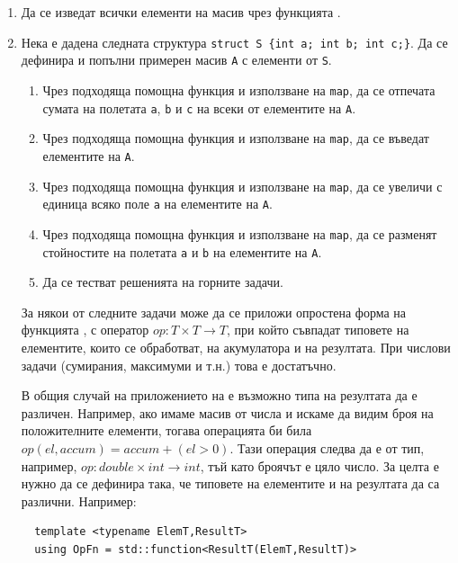 \begin{enumerate}[]  
  \item Да се изведат всички елементи на масив чрез функцията .
  
  \item Нека е дадена следната структура \texttt{struct S \{int a; int b; int c;\}}. Да се дефинира и попълни примерен масив \texttt{A} с елементи от  \texttt{S}. 
  
  \begin{enumerate}[label=\alph*)]
    \item Чрез подходяща помощна функция и използване на \texttt{map}, да се отпечата сумата на полетата \texttt{a}, \texttt{b} и \texttt{c} на всеки от елементите на \texttt{A}.
    \item Чрез подходяща помощна функция и използване на \texttt{map}, да се въведат елементите на \texttt{A}.
    \item Чрез подходяща помощна функция и използване на \texttt{map}, да се увеличи с единица всяко поле \texttt{a} на елементите на \texttt{A}.
    \item Чрез подходяща помощна функция и използване на \texttt{map}, да се разменят стойностите на полетата \texttt{a} и \texttt{b} на елементите на \texttt{A}.
    \item Да се тестват решенията на горните задачи.
    
  \end{enumerate}

  \begin{mdframed}[hidealllines=true,backgroundcolor=gray!20]
  За някои от следните задачи може да се приложи опростена форма на функцията , с оператор $op : T \times T \rightarrow T$, при който съвпадат типовете на елементите, които се обработват, на акумулатора и на резултата. При числови задачи (сумирания, максимуми и т.н.) това е достатъчно. 
  
  В общия случай на приложението на  е възможно типа на резултата да е различен. Например, ако имаме масив от  числа и искаме да видим броя на положителните елементи, тогава операцията би била $op(el,accum) = accum + (el>0)$. Тази операция следва да е от тип, например, $op : double \times int \rightarrow int$, тъй като броячът е цяло число. За целта е нужно да се дефинира  така, че типовете на елементите и на резултата да са различни. Например:

  \begin{lstlisting}
  template <typename ElemT,ResultT>
  using OpFn = std::function<ResultT(ElemT,ResultT)>


\end{lstlisting}
\end{mdframed}
\end{enumerate}
